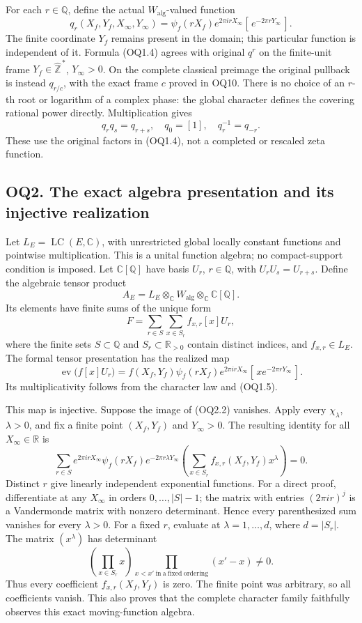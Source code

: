 For each \(r\in\mathbb Q\), define the actual
\(W_{\mathrm{alg}}\)-valued function \[
\boxed{
q_r(X_f,Y_f,X_\infty,Y_\infty)
=\psi_f(rX_f)e^{2\pi irX_\infty}
[\,e^{-2\pi rY_\infty}\,].}
\tag{OQ1.4}
\] The finite coordinate \(Y_f\) remains present in the domain; this
particular function is independent of it. Formula (OQ1.4) agrees with
original \(q^r\) on the finite-unit frame
\(Y_f\in\widehat{\mathbb Z}^{\,*}\), \(Y_\infty>0\). On the complete
classical preimage the original pullback is instead \(q_{r/c}\), with
the exact frame \(c\) proved in OQ10. There is no choice of an \(r\)-th
root or logarithm of a complex phase: the global character defines the
covering rational power directly. Multiplication gives \[
q_rq_s=q_{r+s},\quad q_0=[1],\quad q_r^{-1}=q_{-r}.
\tag{OQ1.5}
\] These use the original factors in (OQ1.4), not a completed or
rescaled zeta function.

\subsection{OQ2. The exact algebra presentation and its injective
realization}\label{oq2.-the-exact-algebra-presentation-and-its-injective-realization}

Let \(L_E=\operatorname{LC}(E,\mathbb C)\), with unrestricted global
locally constant functions and pointwise multiplication. This is a
unital function algebra; no compact-support condition is imposed. Let
\(\mathbb C[\mathbb Q]\) have basis \(U_r\), \(r\in\mathbb Q\), with
\(U_rU_s=U_{r+s}\). Define the algebraic tensor product \[
A_E=L_E\otimes_{\mathbb C}W_{\mathrm{alg}}
\otimes_{\mathbb C}\mathbb C[\mathbb Q].
\tag{OQ2.1}
\] Its elements have finite sums of the unique form \[
F=\sum_{r\in S}\sum_{x\in S_r}f_{x,r}[x]U_r,
\tag{OQ2.2}
\] where the finite sets \(S\subset\mathbb Q\) and
\(S_r\subset\mathbb R_{>0}\) contain distinct indices, and
\(f_{x,r}\in L_E\). The formal tensor presentation has the realized map
\[
\operatorname{ev}\bigl(f[x]U_r\bigr)
=f(X_f,Y_f)\psi_f(rX_f)e^{2\pi irX_\infty}
[\,x e^{-2\pi rY_\infty}\,].
\tag{OQ2.3}
\] Its multiplicativity follows from the character law and (OQ1.5).

This map is injective. Suppose the image of (OQ2.2) vanishes. Apply
every \(\chi_\lambda\), \(\lambda>0\), and fix a finite point
\((X_f,Y_f)\) and \(Y_\infty>0\). The resulting identity for all
\(X_\infty\in\mathbb R\) is \[
\sum_{r\in S}
e^{2\pi irX_\infty}\psi_f(rX_f)e^{-2\pi r\lambda Y_\infty}
\left(\sum_{x\in S_r}f_{x,r}(X_f,Y_f)x^\lambda\right)=0.
\tag{OQ2.4}
\] Distinct \(r\) give linearly independent exponential functions. For a
direct proof, differentiate at any \(X_\infty\) in orders
\(0,\ldots,|S|-1\); the matrix with entries \((2\pi ir)^j\) is a
Vandermonde matrix with nonzero determinant. Hence every parenthesized
sum vanishes for every \(\lambda>0\). For a fixed \(r\), evaluate at
\(\lambda=1,\ldots,d\), where \(d=|S_r|\). The matrix \((x^\lambda)\)
has determinant \[
\left(\prod_{x\in S_r}x\right)
\prod_{x<x'\ \mathrm{in\ a\ fixed\ ordering}}(x'-x)\ne0.
\tag{OQ2.5}
\] Thus every coefficient \(f_{x,r}(X_f,Y_f)\) is zero. The finite point
was arbitrary, so all coefficients vanish. This also proves that the
complete character family faithfully observes this exact moving-function
algebra.

